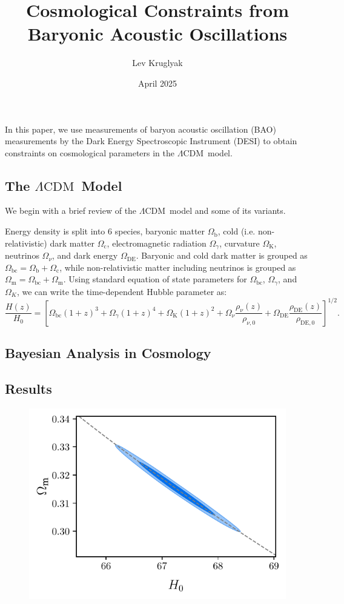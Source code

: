 \documentclass{lkx_paper}
\title{Cosmological Constraints from \\Baryonic Acoustic Oscillations}
\date{April 2025}
\author{Lev Kruglyak}
\renewcommand{\b}{{\mathrm{b}}}
\renewcommand{\c}{{\mathrm{c}}}
\newcommand{\bc}{{\mathrm{bc}}}
\newcommand{\K}{{\mathrm{K}}}
\newcommand{\m}{{\mathrm{m}}}
\newcommand{\DE}{{\mathrm{DE}}}
\newcommand{\LCDM}{$\Lambda\mathrm{CDM}$~}
\begin{document}
In this paper, we use measurements of baryon acoustic oscillation (BAO) measurements by the Dark Energy Spectroscopic Instrument (DESI) to obtain constraints on cosmological parameters in the \LCDM model.

\subsection*{The \LCDM Model}
We begin with a brief review of the \LCDM model and some of its variants.

Energy density is split into 6 species, baryonic matter $\Omega_\b$, cold (i.e. non-relativistic) dark matter $\Omega_\c$, electromagnetic radiation $\Omega_\gamma$, curvature $\Omega_\K$, neutrinos $\Omega_\nu$, and dark energy $\Omega_\DE$. Baryonic and cold dark matter is grouped as $\Omega_\bc=\Omega_\b+\Omega_\c$, while non-relativistic matter including neutrinos is grouped as $\Omega_\m=\Omega_\bc+\Omega_\m$.
Using standard equation of state parameters for $\Omega_\bc$, $\Omega_\gamma$, and $\Omega_K$, we can write the time-dependent Hubble parameter as:
\begin{equation}
  \frac{H(z)}{H_0} = 
  \left[\Omega_\bc(1+z)^3 + \Omega_\gamma(1+z)^4+\Omega_\K(1+z)^2+\Omega_\nu\frac{\rho_\nu(z)}{\rho_{\nu,0}} + \Omega_\DE \frac{\rho_\DE(z)}{\rho_{\DE,0}}\right]^{1/2}.
\end{equation}

\subsection*{Bayesian Analysis in Cosmology}

\subsection*{Results}
\begin{figure}[H]
  \centering
  \includegraphics{figures/CMB-H0-omegam.pdf}
  \caption{}
\end{figure}

\cite{desicollaboration2025desidr2resultsii}
\end{document}
